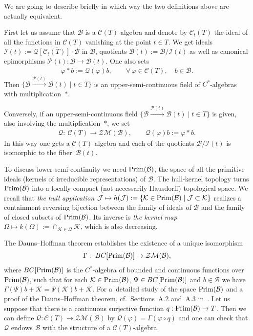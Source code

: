\documentclass[pdftex]{sigma}
\def\C{\mathcal{C}}
\def\B{{\mathcal B}}
\def\K{\mathcal K}
\def\Q{\mathcal Q}
\def\P{\mathcal P}
\begin{document}
We are going to describe brief\/ly in which way the two def\/initions above are actually equivalent.

First let us assume that $\B$ is a $\C(T)$-algebra and denote by $\C_t(T)$ the ideal of all the functions in
$\C(T)$ vanishing at the point $t\in T$. We get ideals
$\mathcal I(t):=\overline{\Q\left[\C_t(T)\right]\cdot\B}$ in $\B$, quotients $\B(t):=\B/\mathcal I(t)$ as well as canonical
epimorphisms $\P(t):\B\rightarrow \B(t)$. One also sets
\begin{gather*}%
\varphi\ast b:=\Q(\varphi)b ,\qquad \forall\,\varphi\in\C(T),\quad b\in\B .
\end{gather*}
Then $\big\{\mathcal B\overset{\P(t)}{\longrightarrow}\mathcal B(t)\mid t\in T\big\}$ is an upper-semi-continuous
f\/ield of $C^*$-algebras with multiplication~$\ast$.

Conversely, if an upper-semi-continuous f\/ield
$\big\{\mathcal B\overset{\P(t)}{\longrightarrow}\mathcal B(t)\mid t\in T\big\}$ is given,
also involving the multiplication~$\ast$, we set
\begin{gather*}%
\Q: \ \C(T)\rightarrow\mathcal Z\mathcal M(\B),\qquad \Q(\varphi)b:=\varphi\ast b.
\end{gather*}
In this way one gets a $\C(T)$-algebra and each of the quotients $\B/\mathcal I(t)$ is isomorphic to the f\/i\-ber~$\B(t)$.

To discuss lower semi-continuity we need ${\rm Prim}(\B)$, the space of all the primitive ideals
(kernels of irreducible representations) of $\B$. The hull-kernel topology
turns ${\rm Prim}(\B)$ into a locally compact (not necessarily Hausdorf\/f) topological space. We recall that {\it the hull application}
$\mathcal J\mapsto h(\mathcal J):=\{\mathcal K\in {\rm Prim}(\B)\mid \mathcal J\subset\mathcal K\}$
realizes a containment reversing bijection between the family of ideals of $\B$ and the family
of closed subsets of ${\rm Prim}(\B)$. Its inverse is {\it the kernel map}
$\Omega\mapsto k(\Omega):=\cap_{\mathcal K\in\Omega}\mathcal K$, which is also decreasing.

The Dauns--Hof\/fman theorem establishes the existence of a unique isomorphism
\[
\Gamma: \ BC[{\rm Prim}(\B)]\to \mathcal Z\mathcal M(\B) ,
\] where $BC[{\rm Prim}(\B)]$ is the $C^*$-algebra of bounded and continuous
functions over ${\rm Prim}(\B)$, such that for each $\K\in {\rm Prim}(\B)$,
$\Psi\in BC[{\rm Prim}(\B)]$ and $b\in\B$ we have $\Gamma(\Psi)b+\mathcal K=\Psi(\mathcal K)b+\mathcal K$.
For a~detailed study of the space ${\rm Prim}(\B)$ and a
proof of the Dauns--Hof\/fman theorem, cf.\ Sections~A.2 and~A.3 in~\cite{RW}.
Let us suppose that there is a continuous surjective function $q:{\rm Prim}(\B)\to T$. Then we can def\/ine
$\Q:\C(T)\to \mathcal Z\mathcal M(\B)$ by $\Q(\varphi)=\Gamma(\varphi\circ q)$ and one can check that
$\Q$ endows $\B$ with the structure of a $\C(T)$-algebra.
\end{document}
